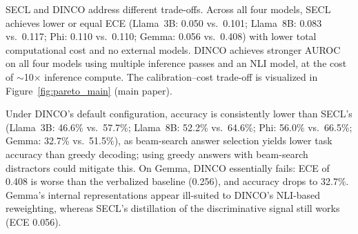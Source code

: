 SECL and DINCO address different trade-offs.
Across all four models, SECL achieves lower or equal ECE
(Llama~3B: 0.050 vs.\ 0.101; Llama~8B: 0.083 vs.\ 0.117;
Phi: 0.110 vs.\ 0.110; Gemma: 0.056 vs.\ 0.408)
with lower total computational cost and no external models.
DINCO achieves stronger AUROC on all four models
using multiple inference passes and an NLI model,
at the cost of $\sim$10$\times$ inference compute.
The calibration--cost trade-off is visualized in Figure~\ref{fig:pareto_main} (main paper).

Under DINCO's default configuration, accuracy is consistently lower than SECL's
(Llama~3B: 46.6\% vs.\ 57.7\%; Llama~8B: 52.2\% vs.\ 64.6\%;
Phi: 56.0\% vs.\ 66.5\%; Gemma: 32.7\% vs.\ 51.5\%),
as beam-search answer selection yields lower task
accuracy than greedy decoding; using greedy answers with beam-search distractors could mitigate this.
On Gemma, DINCO essentially fails: ECE of 0.408 is worse than
the verbalized baseline (0.256), and accuracy drops to 32.7\%.
Gemma's internal representations appear ill-suited
to DINCO's NLI-based reweighting, whereas SECL's distillation
of the discriminative signal still works (ECE 0.056).

